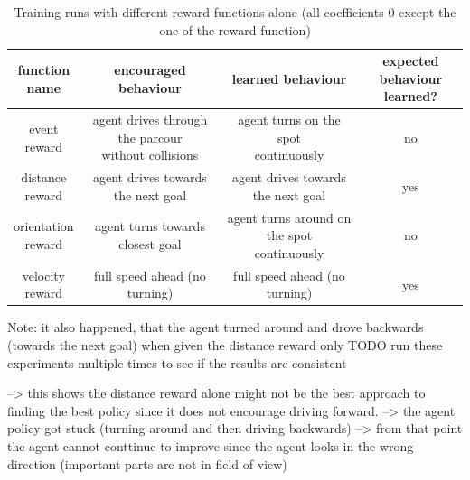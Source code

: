 \begin{table}
    
\caption{Training runs with different reward functions alone (all coefficients 0 except the one of the reward function)}
\begin{center}
\begin{tabular}{|| c | c | c | c ||} 
    \hline
    \makecell{function \\ name} & encouraged behaviour & learned behaviour  & \makecell{expected behaviour \\ learned?} \\ [0.5ex] 
    \hline\hline
    \makecell{event \\ reward} &  \makecell{agent drives through the parcour \\ without collisions} & \makecell{agent turns on the spot \\ continuously} & no \\ 
    \hline
    \makecell{distance \\ reward} & agent drives towards the next goal & agent drives towards the next goal & yes \\
    \hline
    \makecell{orientation \\ reward} & agent turns towards closest goal & \makecell{agent turns around on the spot \\ continuously} & no \\
    \hline
    \makecell{velocity \\ reward}  & full speed ahead (no turning) & full speed ahead (no turning) & yes \\
    \hline
\end{tabular}
\end{center}
\label{table:reward_functions_behaviour}
\end{table}

Note:
it also happened, that the agent turned around and drove backwards (towards the next goal) when given the distance reward only
TODO run these experiments multiple times to see if the results are consistent

--> this shows the distance reward alone might not be the best approach to finding the best policy since it does not encourage driving forward.
--> the agent policy got stuck (turning around and then driving backwards)
    --> from that point the agent cannot conttinue to improve since the agent looks in the wrong direction (important parts are not in field of view)



